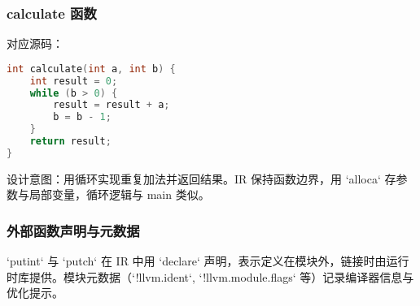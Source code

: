 \documentclass[a4paper]{article}
\begin{document}
\subsubsection{calculate 函数}
对应源码：
\begin{lstlisting}[language=C]
int calculate(int a, int b) {
    int result = 0;
    while (b > 0) {
        result = result + a;
        b = b - 1;
    }
    return result;
}
\end{lstlisting}
设计意图：用循环实现重复加法并返回结果。IR 保持函数边界，用 `alloca` 存参数与局部变量，循环逻辑与 main 类似。

\subsubsection{外部函数声明与元数据}
`putint` 与 `putch` 在 IR 中用 `declare` 声明，表示定义在模块外，链接时由运行时库提供。模块元数据（`!llvm.ident`, `!llvm.module.flags` 等）记录编译器信息与优化提示。

\newpage

 
\end{document}
